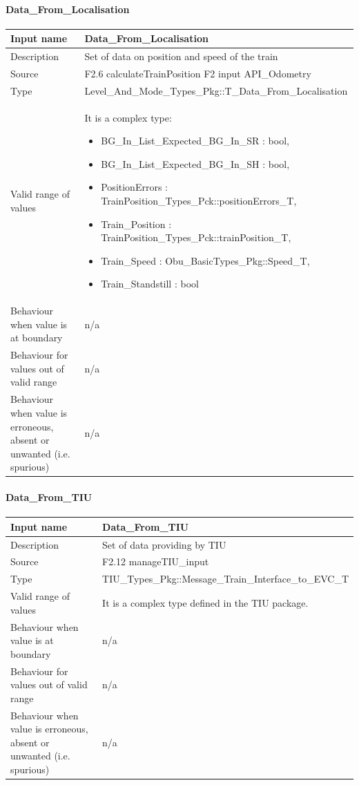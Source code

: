 \paragraph{Data\_From\_Localisation}

\begin{longtable}{p{}p{}}
\toprule
Input name				& Data\_From\_Localisation \\
\midrule
Description				& Set of data on position and speed of the train \\
\midrule
Source					& F2.6 calculateTrainPosition\newline
F2 input API\_Odometry \\ 
\midrule
Type					& Level\_And\_Mode\_Types\_Pkg::T\_Data\_From\_Localisation \\
\midrule
Valid range of values	& It is a complex type: 
\begin{itemize}
\item BG\_In\_List\_Expected\_BG\_In\_SR : bool,
\item  BG\_In\_List\_Expected\_BG\_In\_SH : bool, 
\item PositionErrors : TrainPosition\_Types\_Pck::positionErrors\_T,
\item  Train\_Position : TrainPosition\_Types\_Pck::trainPosition\_T,
\item Train\_Speed : Obu\_BasicTypes\_Pkg::Speed\_T, 
\item Train\_Standstill : bool
\end{itemize} \\
\midrule
Behaviour when value is at boundary	& n/a \\ 
\midrule
Behaviour for values out of valid range	& n/a \\ 
\midrule
Behaviour when value is erroneous, absent or unwanted (i.e. spurious) & n/a \\ 
\bottomrule
\end{longtable}

\paragraph{Data\_From\_TIU}

\begin{longtable}{p{}p{}}
\toprule
Input name				& Data\_From\_TIU \\
\midrule
Description				& Set of data providing by TIU \\
\midrule
Source					& F2.12 manageTIU\_input \\ 
\midrule
Type					& TIU\_Types\_Pkg::Message\_Train\_Interface\_to\_EVC\_T \\
\midrule
Valid range of values	& It is a complex type defined in the TIU package. \\
\midrule
Behaviour when value is at boundary	& n/a \\ 
\midrule
Behaviour for values out of valid range	& n/a \\ 
\midrule
Behaviour when value is erroneous, absent or unwanted (i.e. spurious) & n/a \\ 
\bottomrule
\end{longtable}


